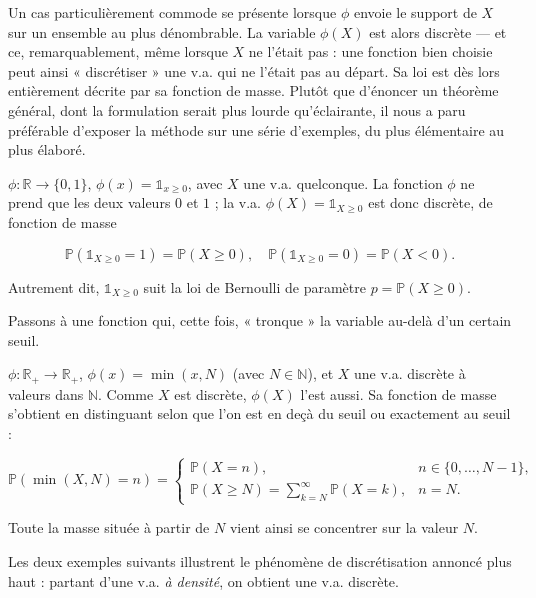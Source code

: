 Un cas particulièrement commode se présente lorsque $\phi$ envoie le support de $X$ sur un ensemble au plus dénombrable. La variable $\phi(X)$ est alors discrète — et ce, remarquablement, même lorsque $X$ ne l'était pas : une fonction bien choisie peut ainsi « discrétiser » une v.a. qui ne l'était pas au départ. Sa loi est dès lors entièrement décrite par sa fonction de masse. Plutôt que d'énoncer un théorème général, dont la formulation serait plus lourde qu'éclairante, il nous a paru préférable d'exposer la méthode sur une série d'exemples, du plus élémentaire au plus élaboré.

\begin{exemple}
$\phi : \mathbb{R} \to \{0, 1\}$, $\phi(x) = \mathbb{1}_{x \geq 0}$, avec $X$ une v.a. quelconque. La fonction $\phi$ ne prend que les deux valeurs $0$ et $1$ ; la v.a. $\phi(X) = \mathbb{1}_{X \geq 0}$ est donc discrète, de fonction de masse

$$
\mathbb{P}(\mathbb{1}_{X \geq 0} = 1) = \mathbb{P}(X \geq 0), \quad \mathbb{P}(\mathbb{1}_{X \geq 0} = 0) = \mathbb{P}(X < 0).
$$

Autrement dit, $\mathbb{1}_{X \geq 0}$ suit la loi de Bernoulli de paramètre $p = \mathbb{P}(X \geq 0)$.
\end{exemple}

Passons à une fonction qui, cette fois, « tronque » la variable au-delà d'un certain seuil.

\begin{exemple}
$\phi : \mathbb{R}_+ \to \mathbb{R}_+$, $\phi(x) = \min(x, N)$ (avec $N \in \mathbb{N}$), et $X$ une v.a. discrète à valeurs dans $\mathbb{N}$. Comme $X$ est discrète, $\phi(X)$ l'est aussi. Sa fonction de masse s'obtient en distinguant selon que l'on est en deçà du seuil ou exactement au seuil :

$$
\mathbb{P}(\min(X, N) = n) = \begin{cases} \mathbb{P}(X = n), & n \in \{0, \dots, N - 1\}, \\[4pt] \mathbb{P}(X \geq N) = \displaystyle\sum_{k=N}^\infty \mathbb{P}(X = k), & n = N. \end{cases}
$$

Toute la masse située à partir de $N$ vient ainsi se concentrer sur la valeur $N$.
\end{exemple}

Les deux exemples suivants illustrent le phénomène de discrétisation annoncé plus haut : partant d'une v.a. \emph{à densité}, on obtient une v.a. discrète.

